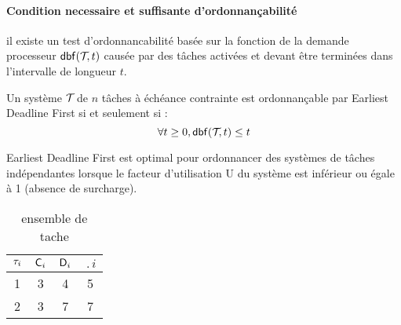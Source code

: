 \paragraph{Condition necessaire et suffisante
  d'ordonnançabilité}\cite{BHR93}

il existe un test d’ordonnancabilité basée sur la fonction de la
demande processeur $\mathsf{dbf}(\mathcal{T}_{},t)$ causée par des tâches activées et
devant être terminées dans l’intervalle de longueur $t$.

\begin{theoreme}
Un système $\mathcal{T}_{}$ de $n$ tâches à échéance contrainte est
ordonnançable par Earliest Deadline First si et seulement si :
\begin{equation}
\forall t \geq 0 , \mathsf{dbf}(\mathcal{T}_{},t) \leq t 
\end{equation}
\end{theoreme}

\begin{theoreme}
Earliest Deadline First est optimal pour ordonnancer des systèmes de
tâches indépendantes lorsque le facteur d'utilisation U du système est
inférieur ou égale à 1 (absence de surcharge).
\end{theoreme}

\begin{table}[h]
\begin{center}
\begin{tabular}{|c|c|c|c|}
 \hline$\tau_{i}$ & $\mathsf{C}_{i}$ & $\mathsf{D}_{i}$ & $\period{i}$\\ 
 \hline1 & 3 & 4 & 5\\ 
 \hline2 & 3 & 7 & 7 \\  
 \hline
 \end{tabular}
\end{center}
\caption{ensemble de tache } \label{tab:exempleEDF}
\end{table}






